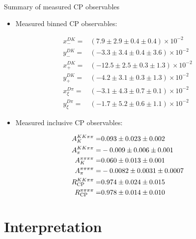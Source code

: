 \documentclass{beamer}
\begin{document}
\begin{frame}{Summary of measured CP observables}
  \vspace{-0.2cm}
  \begin{itemize}
    \item{Measured binned CP observables:}
  \end{itemize}
  \vspace{-0.2cm}
  \begin{align*}
    x_-^{DK} =& (7.9 \pm 2.9 \pm 0.4 \pm 0.4)\times 10^{-2} \\
    y_-^{DK} =& (-3.3 \pm 3.4 \pm 0.4 \pm 3.6)\times 10^{-2} \\
    x_+^{DK} =& (-12.5 \pm 2.5 \pm 0.3 \pm 1.3)\times 10^{-2} \\
    y_+^{DK} =& (-4.2 \pm 3.1 \pm 0.3 \pm 1.3)\times 10^{-2} \\
    x_\xi^{D\pi} =& (-3.1 \pm 4.3 \pm 0.7 \pm 0.1)\times 10^{-2} \\
    y_\xi^{D\pi} =& (-1.7 \pm 5.2 \pm 0.6 \pm 1.1)\times 10^{-2}
  \end{align*}
  \vspace{-0.7cm}
  \begin{itemize}
    \item{Measured inclusive CP observables:}
  \end{itemize}
  \vspace{-0.2cm}
  \begin{align*}
    A_K^{KK\pi\pi} =& 0.093 \pm 0.023 \pm 0.002 \\
    A_\pi^{KK\pi\pi} =& -0.009 \pm 0.006 \pm 0.001 \\
    A_K^{\pi\pi\pi\pi} =& 0.060 \pm 0.013 \pm 0.001 \\
    A_\pi^{\pi\pi\pi\pi} =& -0.0082 \pm 0.0031 \pm 0.0007 \\
    R_{\rm CP}^{KK\pi\pi} =& 0.974 \pm 0.024 \pm 0.015 \\
    R_{\rm CP}^{\pi\pi\pi\pi} =& 0.978 \pm 0.014 \pm 0.010
  \end{align*}
\end{frame}

\section{Interpretation}
\end{document}
